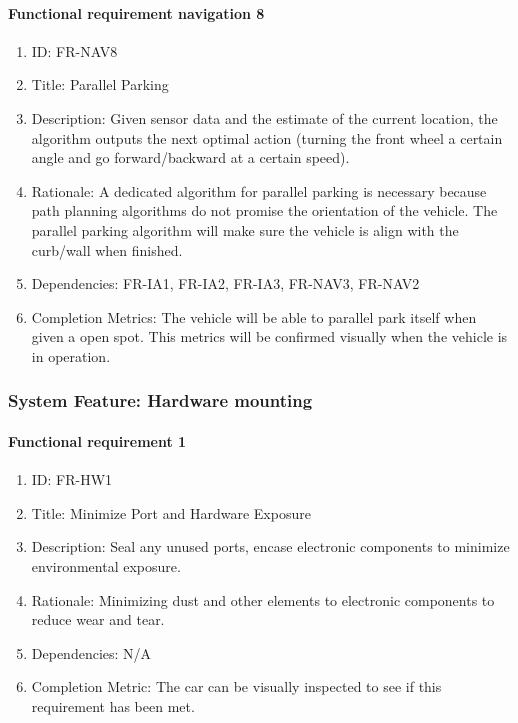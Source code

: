 \documentclass[compsoc,draftclsnofoot,onecolumn,10pt]{IEEEtran}
\begin{document}
	\paragraph{Functional requirement navigation 8}
		\begin{enumerate}
			\item ID: FR-NAV8
			\item Title: Parallel Parking
			\item Description: Given sensor data and the estimate of the current location, the algorithm outputs the next optimal action (turning the front wheel a certain angle and go forward/backward at a certain speed).
			\item Rationale: A dedicated algorithm for parallel parking is necessary because path planning algorithms do not promise the orientation of the vehicle. The parallel parking algorithm will make sure the vehicle is align with the curb/wall when finished.
			\item Dependencies: FR-IA1, FR-IA2, FR-IA3, FR-NAV3, FR-NAV2
			\item Completion Metrics: The vehicle will be able to parallel park itself when given a open spot. 
			This metrics will be confirmed visually when the vehicle is in operation.  
		\end{enumerate}		
		
\subsubsection{System Feature: Hardware mounting}
	\paragraph{Functional requirement 1}
		\begin{enumerate}
			\item ID: FR-HW1
			\item Title: Minimize Port and Hardware Exposure
			\item Description: Seal any unused ports, encase electronic components to minimize environmental exposure.
			\item Rationale: Minimizing dust and other elements to electronic components to reduce wear and tear.
			\item Dependencies: N/A
			\item Completion Metric: The car can be visually inspected to see if this requirement has been met. 
		\end{enumerate}
\end{document}
